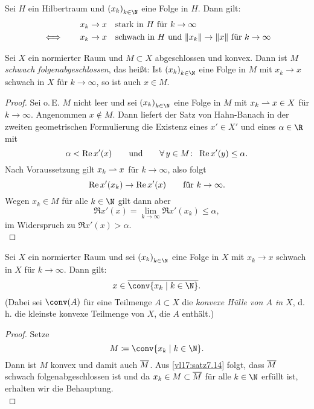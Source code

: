 \begin{thSatz}
    Sei $H$ ein Hilbertraum und $\kSeq x$ eine Folge in $H$. Dann gilt:
    \begin{align*}
        &x_k\to x \quad\text{stark in $H$ für $k\to\infty$} \\
        \iff\qquad 
        &x_k\to x \quad\text{schwach in $H$ und
            $\norm{x_k}\to\norm{x}$ für $k\to\infty$}
        \end{align*}
\end{thSatz}


\begin{thSatz} \label{vl17:satz7.14}
    Sei $X$ ein normierter Raum und $M\subset X$ abgeschlossen und konvex.
    Dann ist $M$ \emph{schwach folgenabgeschlossen}, das heißt: Ist
    $\kSeq x$ eine Folge in $M$ mit $x_k\to x$ schwach in $X$ für $k\to\infty$,
    so ist auch $x\in M$.
\end{thSatz}

\begin{proof}
    Sei o.\,E. $M$ nicht leer und sei $\kSeq x$ eine Folge in $M$ mit
    $x_k\weakto x\in X$ für $k\to\infty$.
    Angenommen $x\notin M$. Dann liefert der Satz von Hahn-Banach in der zweiten
    geometrischen Formulierung 
    die Existenz eines $x'\in X'$ und eines $\alpha\in\R$ mit
    \[ \alpha < \Re x'(x) \qqtextqq{und} \forall\,y\in M\colon\;
        \Re x'(y) \leq \alpha
    . \]
    Nach Voraussetzung gilt $x_k\weakto x$ für $k\to\infty$, also folgt
    \[ \Re x'(x_k)\to \Re x'(x) \fuer k\to\infty  . \]
    Wegen $x_k\in M$ für alle $k\in\N$ gilt dann aber
    \[ \Re x'(x) = \lim_{k\to\infty} \Re x'(x_k) \leq \alpha , \]
    im Widerspruch zu $\Re x'(x) > \alpha$.
    \\
\end{proof}

\begin{thLemma}
    Sei $X$ ein normierter Raum und sei $\kSeq x$ eine Folge in $X$ mit
    $x_k\to x$ schwach in $X$ für $k\to\infty$.
    Dann gilt: 
    \[ x\in \setclosure{\conv\{x_k\Mid k\in\N\}}  . \]
    (Dabei sei $\conv(A)$ für eine Teilmenge $A\subset X$ die \emph{konvexe Hülle
    von $A$ in $X$}, d.\,h. die kleinste konvexe Teilmenge von $X$,
    die $A$ enthält.)
\end{thLemma}

\begin{proof}
    Setze
    \[ M \defeq \conv\{ x_k \Mid k\in\N \}  .\]
    Dann ist $M$ konvex und damit auch $\setclosure M$.
    Aus \cref{vl17:satz7.14} folgt, dass $\setclosure M$ 
    schwach folgenabgeschlossen ist und da $x_k\in M \subset
    \setclosure{M}$ für alle $k\in\N$ erfüllt ist, erhalten
    wir die Behauptung.
    \\
\end{proof}

